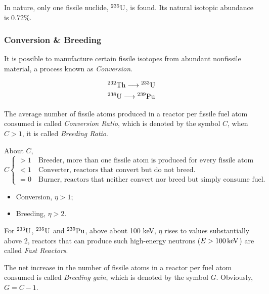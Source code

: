 In nature, only one fissile nuclide, ${}^{235}{\rm U}$, is found. Its natural isotopic abundance is 0.72\%. 

\subsubsection*{Conversion \& Breeding}

It is possible to manufacture certain fissile isotopes from abundant nonfissile
material, a process known as {\itshape Conversion}.

\begin{align}
    &{}^{232}{\rm Th} \longrightarrow {}^{233}{\rm U} \\
    &{}^{238}{\rm U} \longrightarrow {}^{239}{\rm Pu}
\end{align}

\begin{definition}
    The average number of fissile atoms produced in a reactor per fissile fuel atom consumed is called {\itshape Conversion Ratio}, which is denoted by the symbol $C$, when $C > 1$, it is called {\itshape Breeding Ratio}.
\end{definition}

About $C$, 
\begin{equation}
    C \begin{cases}
        >1\quad \text{Breeder, more than one fissile atom is produced for every fissile atom consumed.} \\
        <1\quad \text{Converter, reactors that convert but do not breed.} \\
        =0\quad \text{Burner, reactors that neither convert nor breed but simply consume fuel.}
    \end{cases}
\end{equation}

\begin{itemize}
    \item Conversion, $\eta > 1$;
    \item Breeding, $\eta > 2$.
\end{itemize}

For ${}^{233}{\rm U}$, ${}^{235}{\rm U}$ and ${}^{239}{\rm Pu}$, above about 100 keV, $\eta$ rises to values substantially above 2, reactors that can produce such high-energy neutrons ($E > 100\,{\rm keV}$) are called {\itshape Fast Reactors}.

\begin{definition}
    The net increase in the number of fissile atoms in a reactor per fuel atom consumed is called {\itshape Breeding gain}, which is denoted by the symbol $G$. Obviously, $G = C - 1$.
\end{definition}

